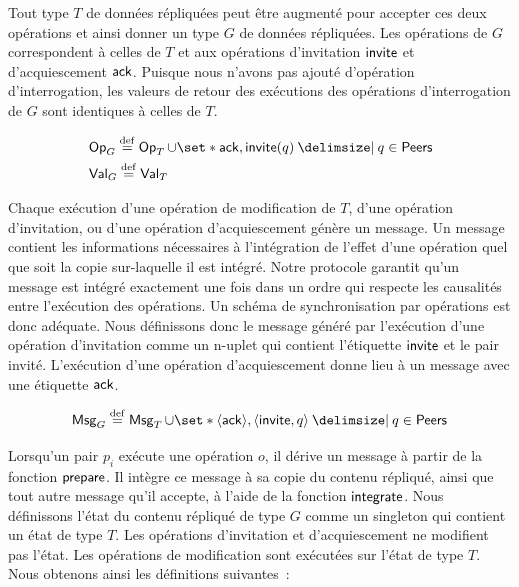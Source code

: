 
Tout type $T$ de données répliquées peut être augmenté pour accepter ces deux opérations et ainsi donner un type $G$ de données répliquées.
Les opérations de $G$ correspondent à celles de $T$ et aux opérations d'invitation $\operatorname{\mathsf{invite}}$ et d'acquiescement $\operatorname{\mathsf{ack}}$.
Puisque nous n'avons pas ajouté d'opération d'interrogation, les valeurs de retour des exécutions des opérations d'interrogation de $G$ sont identiques à celles de $T$.

\begin{align*}
    &\trm{Op}_G \defeq \trm{Op}_T \cup \set*{\trm{ack}, \trm{invite}(q) \given q \in \trm{Peers}}\\
    &\trm{Val}_G \defeq \trm{Val}_T
\end{align*}

Chaque exécution d'une opération de modification de $T$, d'une opération d'invitation, ou d'une opération d'acquiescement génère un message.
Un message contient les informations nécessaires à l'intégration de l'effet d'une opération quel que soit la copie sur-laquelle il est intégré.
Notre protocole garantit qu'un message est intégré exactement une fois dans un ordre qui respecte les causalités entre l'exécution des opérations.
Un schéma de synchronisation par opérations est donc adéquate.
Nous définissons donc le message généré par l'exécution d'une opération d'invitation comme un n-uplet qui contient l'étiquette $\operatorname{\mathsf{invite}}$ et le pair invité.
L'exécution d'une opération d'acquiescement donne lieu à un message avec une étiquette $\operatorname{\mathsf{ack}}$.

\begin{equation*}
    \trm{Msg}_G \defeq \trm{Msg}_T \cup \set*{\tuple*{\trm{ack}}, \tuple*{\trm{invite}, q} \given q \in \trm{Peers}}
\end{equation*}

Lorsqu'un pair $p_i$ exécute une opération $o$, il dérive un message à partir de la fonction $\operatorname{\mathsf{prepare}}$.
Il intègre ce message à sa copie du contenu répliqué, ainsi que tout autre message qu'il accepte, à l'aide de la fonction $\operatorname{\mathsf{integrate}}$.
Nous définissons l'état du contenu répliqué de type $G$ comme un singleton qui contient un état de type $T$.
Les opérations d'invitation et d'acquiescement ne modifient pas l'état.
Les opérations de modification sont exécutées sur l'état de type $T$.
Nous obtenons ainsi les définitions suivantes~:

